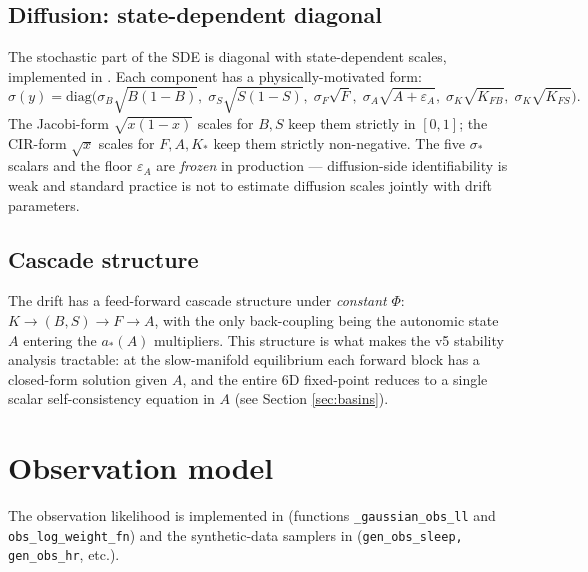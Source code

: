 \documentclass[11pt,a4paper]{article}
\theoremstyle{definition}
\begin{document}
\subsection{Diffusion: state-dependent diagonal} \label{sec:diffusion}

The stochastic part of the SDE is diagonal with state-dependent scales,
implemented in . Each component
has a physically-motivated form:
\begin{equation}
\sigma(y) = \mathrm{diag}\!\Big(
  \sigma_B \sqrt{B(1-B)},\;
  \sigma_S \sqrt{S(1-S)},\;
  \sigma_F \sqrt{F},\;
  \sigma_A \sqrt{A + \varepsilon_A},\;
  \sigma_K \sqrt{K_{FB}},\;
  \sigma_K \sqrt{K_{FS}}
\Big).
\label{eq:diffusion}
\end{equation}
The Jacobi-form $\sqrt{x(1-x)}$ scales for $B, S$ keep them strictly in
$[0, 1]$; the CIR-form $\sqrt{x}$ scales for $F, A, K_{*}$ keep them
strictly non-negative. The five $\sigma_*$ scalars and the floor
$\varepsilon_A$ are \emph{frozen} in production --- diffusion-side
identifiability is weak and standard practice is not to estimate
diffusion scales jointly with drift parameters.

\subsection{Cascade structure} \label{sec:cascade}

The drift has a feed-forward cascade structure under \emph{constant}
$\Phi$: $K \to (B, S) \to F \to A$, with the only back-coupling being
the autonomic state $A$ entering the $a_*(A)$ multipliers. This
structure is what makes the v5 stability analysis tractable: at the
slow-manifold equilibrium each forward block has a closed-form
solution given $A$, and the entire 6D fixed-point reduces to a single
scalar self-consistency equation in $A$ (see Section
\ref{sec:basins}).


\section{Observation model} \label{sec:obs}

The observation likelihood is implemented in
 (functions
\texttt{\_gaussian\_obs\_ll} and \texttt{obs\_log\_weight\_fn}) and the
synthetic-data samplers in 
(\texttt{gen\_obs\_sleep, gen\_obs\_hr}, etc.).
\end{document}
